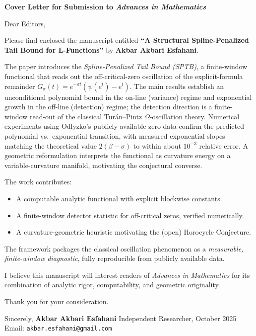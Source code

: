 
  

\begin{center}
\textbf{Cover Letter for Submission to \emph{Advances in Mathematics}}\\[6pt]
\end{center}

Dear Editors,

Please find enclosed the manuscript entitled
\textbf{“A Structural Spline-Penalized Tail Bound for L-Functions”}
by \textbf{Akbar Akbari Esfahani}.

The paper introduces the \emph{Spline-Penalized Tail Bound (SPTB)}, a
finite-window functional that reads out the off-critical-zero oscillation of
the explicit-formula remainder $G_\sigma(t)=e^{-\sigma t}(\psi(e^t)-e^t)$.
The main results establish an unconditional polynomial bound in the on-line
(variance) regime and exponential growth in the off-line (detection) regime;
the detection direction is a finite-window read-out of the classical
Tur\'an--Pintz $\Omega$-oscillation theory.  Numerical experiments using
Odlyzko's publicly available zero data confirm the predicted polynomial
vs.\ exponential transition, with measured exponential slopes matching the
theoretical value $2(\beta-\sigma)$ to within about $10^{-3}$ relative error.
A geometric reformulation interprets the functional as curvature energy on a
variable-curvature manifold, motivating the conjectural converse.

The work contributes:
  \begin{itemize}
\item A computable analytic functional with explicit blockwise constants.
\item A finite-window detector statistic for off-critical zeros, verified numerically.
\item A curvature-geometric heuristic motivating the (open) Horocycle Conjecture.
\end{itemize}

The framework packages the classical oscillation phenomenon as a
\emph{measurable, finite-window diagnostic}, fully reproducible from publicly
available data.

I believe this manuscript will interest readers of
\emph{Advances in Mathematics} for its combination of analytic rigor,
computability, and geometric originality.

Thank you for your consideration.

Sincerely,  
\textbf{Akbar Akbari Esfahani}  
Independent Researcher, October 2025  
Email: \texttt{akbar.esfahani@gmail.com}

